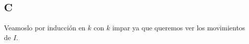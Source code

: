 \documentclass[a4paper]{article}
\begin{document}









\subsection{C}
Veamoslo por inducción en $k$ con $k$ impar ya que queremos ver los movimientos de $I$.
\end{document}
